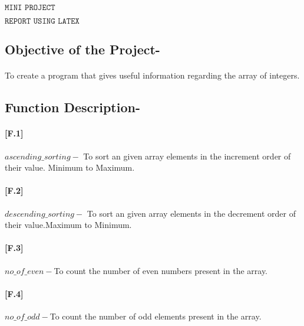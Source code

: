 \documentclass[12pt,a4paper]{article}
\begin{document}
\begin{Huge}
\begin{center}
$\texttt{MINI PROJECT}$
\end{center}

\end{Huge}

\begin{Large}
\begin{center}
$\texttt{REPORT USING LATEX}$
\end{center}
\end{Large}

\subsection{Objective of the Project-}

\paragraph{}To create a program that gives useful information regarding the array of integers. \\



\subsection{Function Description-}

\paragraph{[F.1]}$ascending\_sorting-$ To sort an given array elements in the increment order of their value.	Minimum to Maximum.			
\\														
\paragraph{[F.2]}$descending\_sorting-$ To sort an given array elements in the decrement order of their value.Maximum to Minimum.
\\												
\paragraph{[F.3]}$no\_of\_even-$To count the number of even numbers present in the array.					
\\				
\paragraph{[F.4]}$no\_of\_odd-$To count the number of odd elements present in the array.
\\
\end{document}
